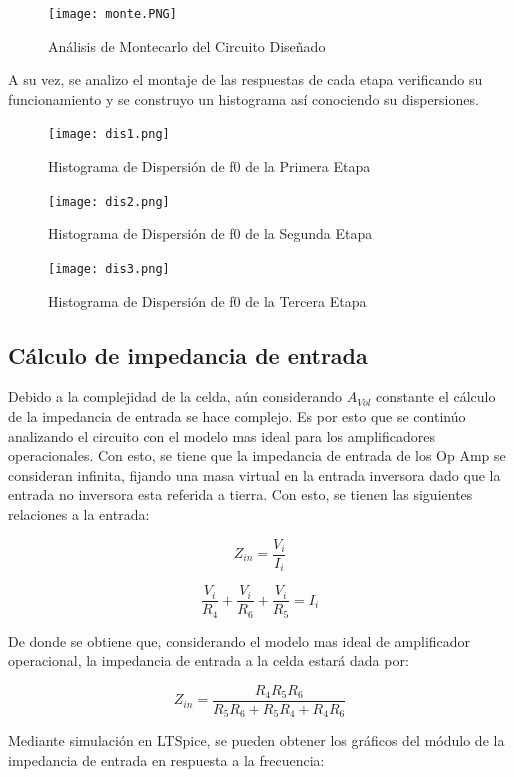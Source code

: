 \begin{figure}
    \centering
    \texttt{[image: monte.PNG]}
    \caption{Análisis de Montecarlo del Circuito Diseñado}
    \label{fig:my_label}
\end{figure}

A su vez, se analizo el montaje de las respuestas de cada etapa verificando su funcionamiento y se construyo un histograma así conociendo su dispersiones.

\begin{figure}[H]
    \centering
    \texttt{[image: dis1.png]}
    \caption{Histograma de Dispersión de f0 de la Primera Etapa}
    \label{ej4dis1}
\end{figure}

\begin{figure}[H]
    \centering
    \texttt{[image: dis2.png]}
    \caption{Histograma de Dispersión de f0 de la Segunda Etapa}
    \label{ej4dis2}
\end{figure}

\begin{figure}[H]
    \centering
    \texttt{[image: dis3.png]}
    \caption{Histograma de Dispersión de f0 de la Tercera Etapa}
    \label{ej4dis3}
\end{figure}

\subsection{Cálculo de impedancia de entrada}

Debido a la complejidad de la celda, aún considerando $A_{Vol}$ constante el cálculo de la impedancia de entrada se hace complejo. Es por esto que se continúo analizando el circuito con el modelo mas ideal para los amplificadores operacionales. Con esto, se tiene que la impedancia de entrada de los Op Amp se consideran infinita, fijando una masa virtual en la entrada inversora dado que la entrada no inversora esta referida a tierra. Con esto, se tienen las siguientes relaciones a la entrada:

$$Z_{in} = \frac{V_{i}}{I_{i}}$$

$$\frac{V_{i}}{R_{4}} + \frac{V_{i}}{R_{6}} + \frac{V_{i}}{R_{5}} = I_{i}$$

De donde se obtiene que, considerando el modelo mas ideal de amplificador operacional, la impedancia de entrada a la celda estará dada por:

$$Z_{in} = \frac{R_{4}R_{5}R_{6}}{R_{5}R_{6}+R_{5}R_{4}+R_{4}R_{6}}$$

Mediante simulación en LTSpice, se pueden obtener los gráficos del módulo de la impedancia de entrada en respuesta a la frecuencia:

